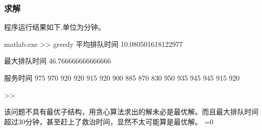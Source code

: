 \documentclass{article}
\begin{document}
\subsubsection{求解}
程序运行结果如下,单位为分钟。
\begin{console}{matlab.exe}
>> greedy
平均排队时间
  10.080501618122977

最大排队时间
  46.766666666666666

服务时间
   975   970   920   920   915   920   900   885   870   830   950   935   945   945   915   920

>> 
\end{console}
\par\indent 该问题不具有最优子结构，用贪心算法求出的解未必是最优解。而且最大排队时间超过30分钟，甚至赶上了救治时间，显然不太可能算是最优解。
\ifnum{}=0
	
\end{document}
